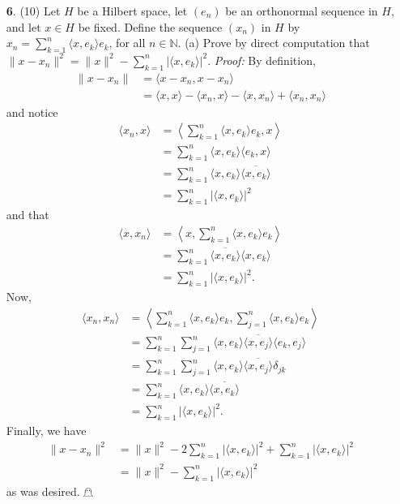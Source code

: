 \documentclass{article}
\begin{document}
\begin{itemize}
    \item[\textbf{6}.] (10) Let $H$ be a Hilbert space, let $(e_n)$ be an orthonormal sequence in $H$, and let $x \in H$ be fixed. Define the sequence $(x_n)$ in $H$ by $x_n = \sum_{k = 1}^n \langle x, e_k\rangle e_k$, for all $n \in \mathbb{N}$. 
    \newline
    (a) Prove by direct computation that $\|x - x_n\|^2 = \|x\|^2 - \sum_{k = 1}^n | \langle x, e_k \rangle|^2$.
    \newline\newline
    \textit{Proof:} By definition,
    \begin{align*}
        \|x - x_n\| &= \langle x - x_n, x - x_n\rangle\\
        &= \langle x, x\rangle - \langle x_n, x\rangle - \langle x, x_n \rangle + \langle x_n, x_n \rangle
    \end{align*}
    and notice
    \begin{align*}
        \langle x_n, x\rangle &= \left\langle \sum_{k = 1}^n \langle x, e_k\rangle e_k, x\right\rangle\\
        &= \sum_{k = 1}^n \langle x, e_k \rangle \langle e_k, x\rangle\\
        &= \sum_{k = 1}^n \langle x, e_k\rangle \overline{\langle x, e_k\rangle}\\
        &= \sum_{k = 1}^n |\langle x, e_k\rangle|^2
    \end{align*}
    and that
    \begin{align*}
        \langle x, x_n \rangle &= \left\langle x, \sum_{k = 1}^n \langle x, e_k\rangle e_k \right\rangle\\
        &= \sum_{k = 1}^n \overline{\langle x, e_k\rangle}\langle x, e_k \rangle\\
        &= \sum_{k = 1}^n |\langle x, e_k \rangle|^2.
    \end{align*}
    Now, 
    \begin{align*}
        \langle x_n, x_n \rangle &= \left\langle \sum_{k = 1}^n \langle x, e_k\rangle e_k, \sum_{j = 1}^n \langle x, e_k \rangle e_k \right\rangle\\
        &= \sum_{k = 1}^n\sum_{j = 1}^n \langle x, e_k\rangle \overline{\langle x, e_j\rangle} \langle e_k, e_j \rangle\\
        &= \sum_{k = 1}^n\sum_{j = 1}^n \langle x, e_k\rangle \overline{\langle x, e_j\rangle} \delta_{jk}\\
        &= \sum_{k = 1}^n \langle x, e_k\rangle \overline{\langle x, e_k\rangle}\\
        &= \sum_{k = 1}^n |\langle x, e_k\rangle|^2.
    \end{align*}
    Finally, we have
    \begin{align*}
        \|x - x_n\|^2 &= \|x\|^2 - 2\sum_{k = 1}^n |\langle x, e_k\rangle |^2 + \sum_{k = 1}^n |\langle x, e_k\rangle |^2\\
        &= \|x\|^2 - \sum_{k = 1}^n |\langle x, e_k \rangle|^2
    \end{align*}
    as was desired. \hfill $\mathghost$
    \newline
    


\end{itemize}
\end{document}
